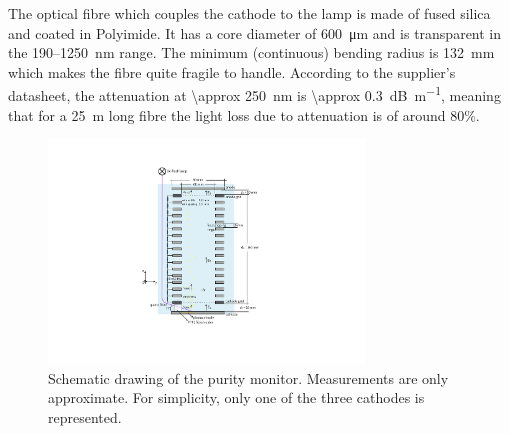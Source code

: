 \documentclass[a4paper,11pt]{article}
\begin{document}
The optical fibre which couples the cathode to the lamp is made of fused silica and coated in Polyimide. It has a core diameter of \SI{600}{\micro m} and is transparent in the 190--\SI{1250}{nm} range. The minimum (continuous) bending radius is \SI{132}{mm} which makes the fibre quite fragile to handle. According to the supplier's datasheet, the attenuation at \SI{\approx 250}{nm} is \SI{\approx 0.3}{dB\per\metre}, meaning that for a \SI{25}{m} long fibre the light loss due to attenuation is of around 80\%. 

\begin{figure}[t]
	\begin{center}
	\includegraphics[width=0.75\textwidth, trim={6cm 4.5cm 7cm 2cm}, clip=true]{figures/schematic_purity_monitor.pdf}			
	\caption[]{Schematic drawing of the purity monitor. Measurements are only approximate. For simplicity, only one of the three cathodes is represented.}
	\label{fig:schematic_PM}
	\end{center}	
\end{figure}
\end{document}
